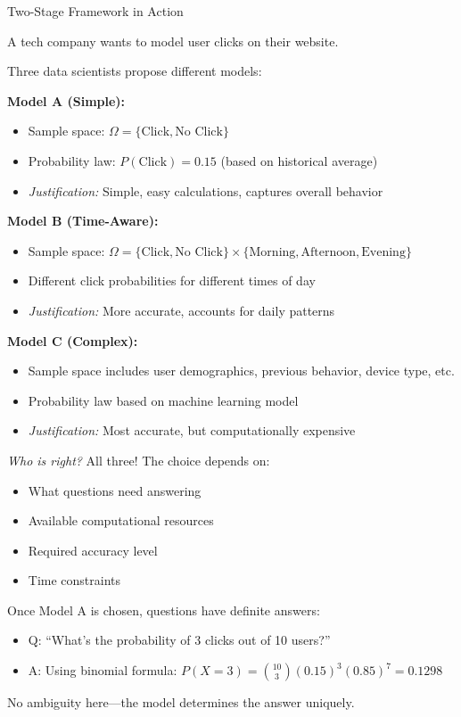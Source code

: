 \begin{exampleboxbreak}{Two-Stage Framework in Action}

 A tech company wants to model user clicks on their website.


Three data scientists propose different models:

\textbf{Model A (Simple):}
\begin{itemize}
    \item Sample space: $\Omega = \{\text{Click}, \text{No Click}\}$
    \item Probability law: $P(\text{Click}) = 0.15$ (based on historical average)
    \item \textit{Justification:} Simple, easy calculations, captures overall behavior
\end{itemize}

\textbf{Model B (Time-Aware):}
\begin{itemize}
    \item Sample space: $\Omega = \{\text{Click}, \text{No Click}\} \times \{\text{Morning}, \text{Afternoon}, \text{Evening}\}$
    \item Different click probabilities for different times of day
    \item \textit{Justification:} More accurate, accounts for daily patterns
\end{itemize}

\textbf{Model C (Complex):}
\begin{itemize}
    \item Sample space includes user demographics, previous behavior, device type, etc.
    \item Probability law based on machine learning model
    \item \textit{Justification:} Most accurate, but computationally expensive
\end{itemize}

\textit{Who is right?} All three! The choice depends on:
\begin{itemize}
    \item What questions need answering
    \item Available computational resources
    \item Required accuracy level
    \item Time constraints
\end{itemize}


Once Model A is chosen, questions have definite answers:
\begin{itemize}
    \item Q: ``What's the probability of 3 clicks out of 10 users?''
    \item A: Using binomial formula: $P(X=3) = \binom{10}{3}(0.15)^3(0.85)^7 = 0.1298$
\end{itemize}

No ambiguity here—the model determines the answer uniquely.

\end{exampleboxbreak}


